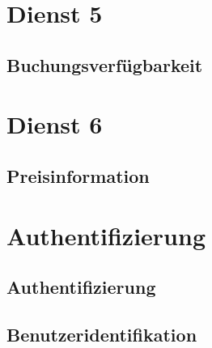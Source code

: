 \section{Dienst 5}
\label{subsec:Datenmodell:Dienst5}

\subsection*{Buchungsverfügbarkeit}



\section{Dienst 6}
\label{subsec:Datenmodell:Dienst6}

\subsection*{Preisinformation}




\section{Authentifizierung}
\subsection*{Authentifizierung}


\subsection*{Benutzeridentifikation}
